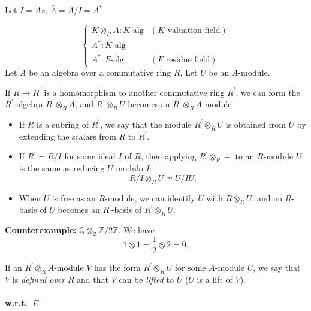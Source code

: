 \documentclass[11pt, a4paper]{report}
\begin{document}
\begin{remark}
Let $I = Az$, $\bar{A} = A/I = A^{*}$.

\[
\begin{cases}
K \otimes_{R} A : K\text{-alg} & (K \text{ valuation field}) \\
A^{*} : K\text{-alg} \\
A^{*} : F\text{-alg} & (F \text{ residue field})
\end{cases}
\]
Let $A$ be an algebra over a commutative ring $R$. Let $U$ be an $A$-module.

If $R \rightarrow R^{\prime}$ is a homomorphism to another commutative ring $R^{\prime}$, we can form the $R^{\prime}$-algebra $R^{\prime} \otimes_R A$, and $R^{\prime} \otimes_R U$ becomes an $R^{\prime} \otimes_R A$-module.

\begin{itemize}
\item If $R$ is a subring of $R^{\prime}$, we say that the module $R^{\prime} \otimes_R U$ is obtained from $U$ by extending the scalars from $R$ to $R^{\prime}$.

\item If $R^{\prime}=R / I$ for some ideal $I$ of $R$, then applying $R^{\prime} \otimes_R -$ to an $R$-module $U$ is the same as reducing $U$ modulo $I$:
\[
R/I \otimes_R U \simeq U / I U.
\]

\item When $U$ is free as an $R$-module, we can identify $U$ with $R \otimes_R U$, and an $R$-basis of $U$ becomes an $R^{\prime}$-basis of $R^{\prime} \otimes_R U$.
\end{itemize}

\textbf{Counterexample:} $\mathbb{Q} \otimes_{\mathbb{Z}} \mathbb{Z}/2\mathbb{Z}$. We have
\[
1 \otimes 1 = \frac{1}{2} \otimes 2 = 0.
\]

If an $R^{\prime} \otimes_R A$-module $V$ has the form $R^{\prime} \otimes_R U$ for some $A$-module $U$, we say that $V$ is \emph{defined over} $R$ and that $V$ can be \emph{lifted} to $U$ ($U$ is a lift of $V$).

\end{remark}

\begin{proposition}

\end{proposition}

\paragraph{w.r.t.\ $E$}
\end{document}
